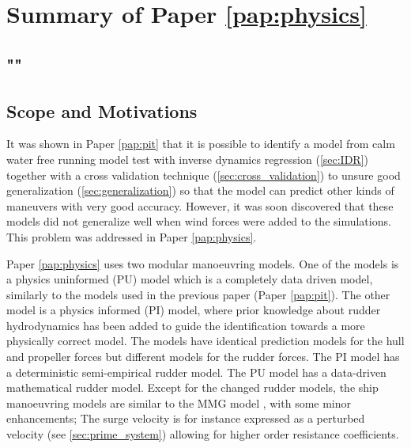 \section{Summary of Paper \ref{pap:physics}}
\subsection*{""}
\subsection*{Scope and Motivations}
It was shown in Paper \ref{pap:pit} that it is possible to identify a model from calm water free running model test with inverse dynamics regression (\autoref{sec:IDR}) together with a cross validation technique (\autoref{sec:cross_validation}) to unsure good generalization (\autoref{sec:generalization}) so that the model can predict other kinds of maneuvers with very good accuracy. However, it was soon discovered that these models did not generalize well when wind forces were added to the simulations. This problem was addressed in Paper \ref{pap:physics}.

Paper \ref{pap:physics} uses two modular manoeuvring models. One of the models is a physics uninformed (PU) model which is a completely data driven model, similarly to the models used in the previous paper (Paper \ref{pap:pit}).
The other model is a physics informed (PI) model, where prior knowledge about rudder hydrodynamics has been added to guide the identification towards a more physically correct model. 
The models have identical prediction models for the hull and propeller forces but different models for the rudder forces. The PI model has a deterministic semi-empirical rudder model. The PU model has a data-driven mathematical rudder model. Except for the changed rudder models, the ship manoeuvring models are similar to the MMG model \cite{yasukawa_introduction_2015}, with some minor enhancements; The surge velocity is for instance expressed as a perturbed velocity (see \autoref{sec:prime_system}) allowing for higher order resistance coefficients.

